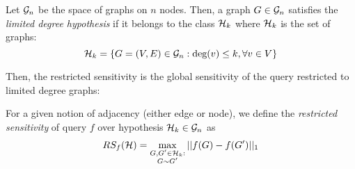  \begin{definition}
 Let $\mathcal{G}_n$ be the space of graphs on $n$ nodes. Then, a graph $G \in \mathcal{G}_n$ satisfies the \emph{limited degree hypothesis} if it belongs to the class $\mathcal{H}_k$ where $\mathcal{H}_k$ is the set of graphs:
 $$\mathcal{H}_k = \{G = (V,E) \in \mathcal{G}_n : \text{deg}(v) \leq k, \forall v \in V \}$$
 \end{definition}
 
 Then, the restricted sensitivity is the global sensitivity of the query restricted to limited degree graphs:

\begin{definition}
\label{def:restricted-sensitivity}
For a given notion of adjacency (either edge or node), we define the \emph{restricted sensitivity} of query $f$ over hypothesis $\mathcal{H}_k \in \mathcal{G}_n$ as
$$RS_f(\mathcal{H}) =\max_{\substack{G, G'\in \mathcal{H}_k:\\ G\sim G'}} ||f(G)- f(G')||_1$$
\end{definition}




